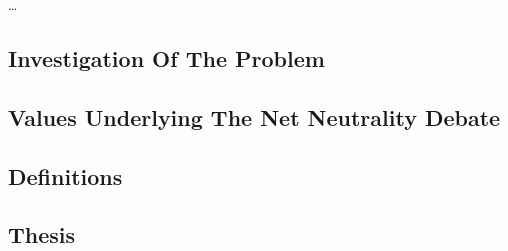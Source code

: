 \ldots

\subsection{Investigation Of The Problem}
\label{sec:intro_problem}


\subsection{Values Underlying The Net Neutrality Debate}
\label{sec:values}


\subsection{Definitions}
\label{sec:intro_def}


\subsection{Thesis}
\label{sec:intro_thesis}

